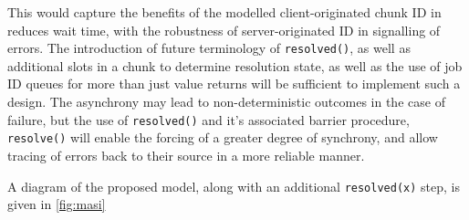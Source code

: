 This would capture the benefits of the modelled client-originated chunk ID in
reduces wait time, with the robustness of server-originated ID in signalling of
errors.
The introduction of future terminology of \texttt{resolved()}, as well as
additional slots in a chunk to determine resolution state, as well as the use
of job ID queues for more than just value returns will be sufficient to
implement such a design.
The asynchrony may lead to non-deterministic outcomes in the case of failure,
but the use of \texttt{resolved()} and it's associated barrier procedure,
\texttt{resolve()} will enable the forcing of a greater degree of synchrony,
and allow tracing of errors back to their source in a more reliable manner.

A diagram of the proposed model, along with an additional \texttt{resolved(x)}
step, is given in \ref{fig:masi}

